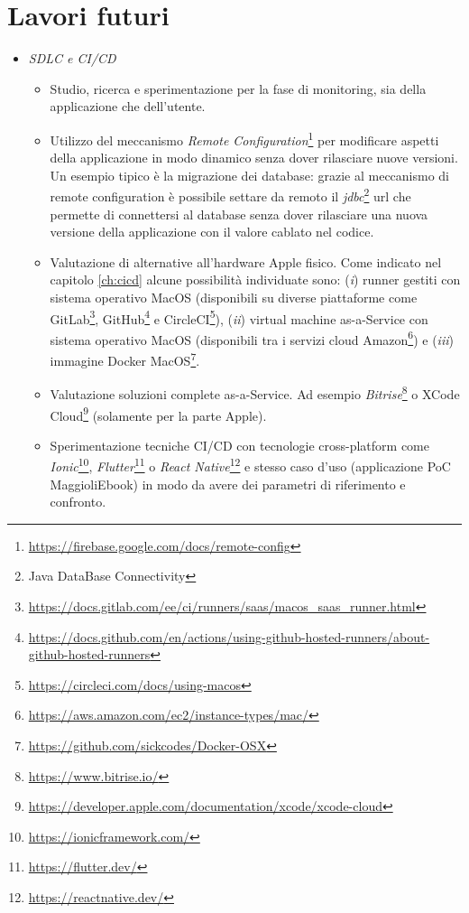 \section{Lavori futuri}
\begin{itemize}
    \item \textit{SDLC e CI/CD}
    \begin{itemize}
        \item Studio, ricerca e sperimentazione per la fase di monitoring, sia della applicazione che dell'utente.
        \item Utilizzo del meccanismo \textit{Remote Configuration}\footnote{\url{https://firebase.google.com/docs/remote-config}} per modificare aspetti della applicazione in modo dinamico senza dover rilasciare nuove versioni. Un esempio tipico è la migrazione dei database: grazie al meccanismo di remote configuration è possibile settare da remoto il \textit{jdbc}\footnote{Java DataBase Connectivity} url che permette di connettersi al database senza dover rilasciare una nuova versione della applicazione con il valore cablato nel codice.
        \item Valutazione di alternative all'hardware Apple fisico. Come indicato nel capitolo \ref{ch:cicd} alcune possibilità individuate sono: (\textit{i}) runner gestiti con sistema operativo MacOS (disponibili su diverse piattaforme come GitLab\footnote{\url{https://docs.gitlab.com/ee/ci/runners/saas/macos_saas_runner.html}}, GitHub\footnote{\url{https://docs.github.com/en/actions/using-github-hosted-runners/about-github-hosted-runners}} e CircleCI\footnote{\url{https://circleci.com/docs/using-macos}}), (\textit{ii}) virtual machine as-a-Service con sistema operativo MacOS (disponibili tra i servizi cloud Amazon\footnote{\url{https://aws.amazon.com/ec2/instance-types/mac/}}) e (\textit{iii}) immagine Docker MacOS\footnote{\url{https://github.com/sickcodes/Docker-OSX}}.
        \item Valutazione soluzioni complete as-a-Service. Ad esempio \textit{Bitrise}\footnote{\url{https://www.bitrise.io/}} o XCode Cloud\footnote{\url{https://developer.apple.com/documentation/xcode/xcode-cloud}} (solamente per la parte Apple).
        \item Sperimentazione tecniche CI/CD con tecnologie cross-platform come \textit{Ionic}\footnote{\url{https://ionicframework.com/}}, \textit{Flutter}\footnote{\url{https://flutter.dev/}} o \textit{React Native}\footnote{\url{https://reactnative.dev/}} e stesso caso d'uso (applicazione PoC MaggioliEbook) in modo da avere dei parametri di riferimento e confronto.

\end{itemize}
\end{itemize}

